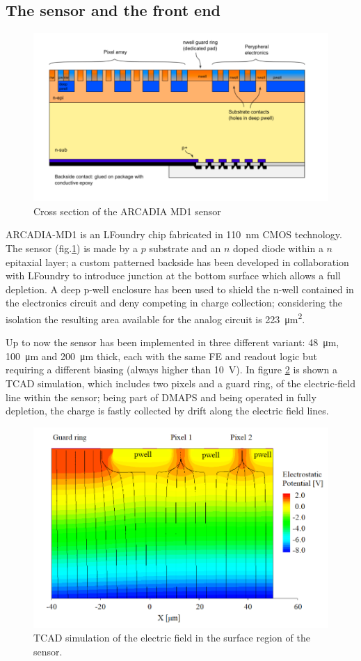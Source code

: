\subsection{The sensor and the front end}
    \begin{figure}[h!]
        \centering
        \includegraphics[width=.8\linewidth]{figures/ARCADIA/sensor.png}
        \caption{Cross section of the ARCADIA MD1 sensor}
        \label{fig:ARCADIA_substrate}
    \end{figure}
    ARCADIA-MD1 is an LFoundry chip fabricated in \SI{110}{nm} CMOS technology.%
    The sensor (fig.\ref{fig:ARCADIA_substrate}) is made by a $p$ substrate and an $n$ doped diode within a $n$ epitaxial layer; a custom patterned backside has been developed in collaboration with LFoundry to introduce junction at the bottom surface which allows a full depletion. 
    A deep p-well enclosure has been used to shield the n-well contained in the electronics circuit and deny competing in charge collection; considering the isolation the resulting area available for the analog circuit is \SI{223}{\um\squared}.

    Up to now the sensor has been implemented in three different variant: \SI{48}{\um}, \SI{100}{\um} and \SI{200}{\um} thick, each with the same FE and readout logic but requiring a different biasing (always higher than \SI{10}{V}). 
    In figure \ref{fig:ARCADIA_E} is shown a TCAD simulation, which includes two pixels and a guard ring, of the electric-field line within the sensor; being part of DMAPS and being operated in fully depletion, the charge is fastly collected by drift along the electric field lines. 
    \begin{figure}[h!]
        \centering
        \includegraphics[width=.8\linewidth]{figures/ARCADIA/ARCADIA_TCAD.png}
        \caption{TCAD simulation of the electric field in the surface region of the sensor.}
        \label{fig:ARCADIA_E}
    \end{figure}

